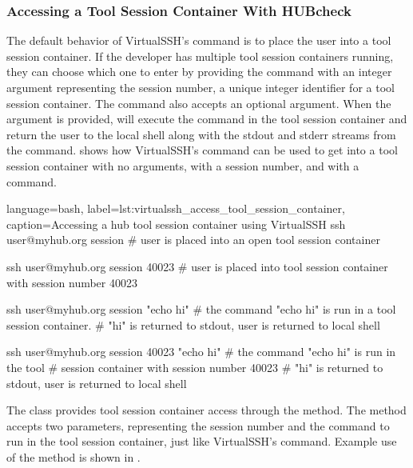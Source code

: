 \subsubsection{Accessing a Tool Session Container With HUBcheck}
\label{ssec:hubcheck_shell_modules_accessing_container}

The default behavior of VirtualSSH's  command is to
place the user into a tool session container.  If the developer has multiple
tool session containers running, they can choose which one to enter by
providing the  command with an integer argument
representing the  session number, a unique integer identifier for a tool
session container. The  command also accepts an optional
 argument.  When the  argument is
provided,  will execute the command in the tool session
container and return the user to the local shell along with the stdout and
stderr streams from the command.
 shows how VirtualSSH's
 command can be used to get into a tool session
container with no arguments, with a session number, and with a command.

\begin{xcode}{%
  language=bash,%
  label=lst:virtualssh_access_tool_session_container,%
  caption={Accessing a hub tool session container using VirtualSSH}%
}
ssh user@myhub.org session
# user is placed into an open tool session container

ssh user@myhub.org session 40023
# user is placed into tool session container with session number 40023

ssh user@myhub.org session "echo hi"
# the command "echo hi" is run in a tool session container.
# "hi" is returned to stdout, user is returned to local shell

ssh user@myhub.org session 40023 "echo hi"
# the command "echo hi" is run in the tool
# session container with session number 40023
# "hi" is returned to stdout, user is returned to local shell
\end{xcode}

The  class provides tool session container access through
the  method. The  method accepts two
parameters, representing the session number and the command to run in the tool
session container, just like VirtualSSH's  command.
Example use of the  method is shown in
.

